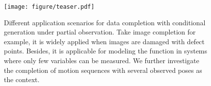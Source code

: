 \documentclass[sigconf]{acmart} %
\begin{document}



\maketitle




\begin{figure}[t]
  \centering
  \vspace{6mm}
  \texttt{[image: figure/teaser.pdf]}
  \caption{
    Different application scenarios for data completion with conditional generation under partial observation. Take image completion for example, it is widely applied when images are damaged with defect points. Besides, it is applicable for modeling the function in systems where only few variables can be measured. We further investigate the completion of motion sequences with several observed poses as the context.
  }
  \label{fig:teaser}
\end{figure}
\end{document}
